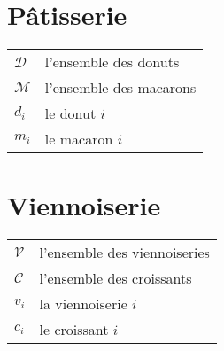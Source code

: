 
\section*{P\^atisserie}

\begin{tabular}{p{2cm} p{11.5cm}}
  \hline
  $\mathcal{D}$ & l'ensemble des donuts\\
  $\mathcal{M}$ & l'ensemble des macarons\\
  $d_i$ & le donut $i$\\
  $m_i$ & le macaron $i$\\
  \hline
\end{tabular}

\section*{Viennoiserie}

\begin{tabular}{p{2cm} p{11.5cm}}
  \hline
  $\mathcal{V}$ & l'ensemble des viennoiseries\\
  $\mathcal{C}$ & l'ensemble des croissants\\
  $v_i$ & la viennoiserie $i$\\
  $c_i$ & le croissant $i$\\
  \hline
\end{tabular}
